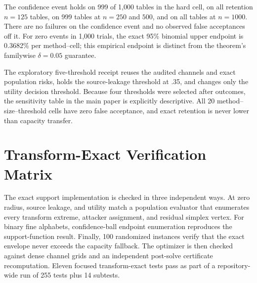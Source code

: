 The confidence event holds on 999 of 1,000 tables in the hard cell, on all
retention $n=125$ tables, on 999 tables at $n=250$ and $500$, and on all tables
at $n=1000$. There are no failures on the confidence event and no observed
false acceptances off it. For zero events in 1,000 trials, the exact 95\%
binomial upper endpoint is 0.3682\% per method--cell; this empirical endpoint is
distinct from the theorem's familywise $\delta=0.05$ guarantee.

The exploratory five-threshold receipt reuses the audited channels and exact
population risks, holds the source-leakage threshold at .35, and changes only the
utility decision threshold. Because four thresholds were selected after
outcomes, the sensitivity table in the main paper is explicitly descriptive.
All 20 method--size--threshold cells have zero false acceptance, and exact
retention is never lower than capacity transfer.

\section{Transform-Exact Verification Matrix}

The exact support implementation is checked in three independent ways. At zero
radius, source leakage, and utility match a population evaluator that enumerates every
transform extreme, attacker assignment, and residual simplex vertex. For
binary fine alphabets, confidence-ball endpoint enumeration reproduces the
support-function result. Finally, 100 randomized instances verify that the
exact envelope never exceeds the capacity fallback. The optimizer is
then checked against dense channel grids and an independent post-solve
certificate recomputation. Eleven focused transform-exact tests pass as part of
a repository-wide run of 255 tests plus 14 subtests.
